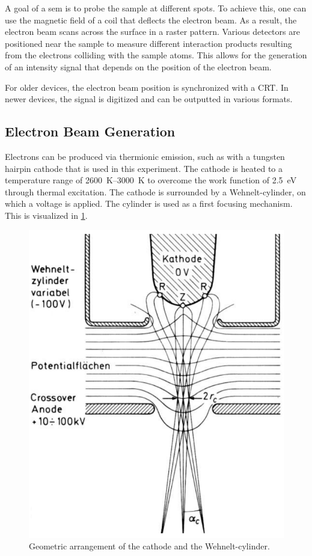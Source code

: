 A goal of a \ac{sem} is to probe the sample at different spots.
To achieve this, one can use the magnetic field of a coil that deflects
the electron beam.
As a result, the electron beam scans across the surface in a raster
pattern. Various detectors are positioned near the sample to measure
different interaction products resulting from the electrons colliding
with the sample atoms. This allows for the generation of an intensity
signal that depends on the position of the electron beam.

For older devices, the electron beam position is synchronized
with a CRT.
In newer devices, the signal is digitized and can be outputted in
various formats.

\subsection{Electron Beam Generation}
Electrons can be produced via thermionic emission, such as with a tungsten hairpin cathode that is used in this experiment.
The cathode is heated to a temperature range of
\qtyrange{2600}{3000}{\kelvin} to overcome the work function of
\qty{2.5}{\electronvolt} through thermal excitation.
The cathode is surrounded by a Wehnelt-cylinder, on which a voltage is
applied.
The cylinder is used as a first focusing mechanism.
This is visualized in \cref{fig:wolfram}.
\begin{figure}
	\centering
	\includegraphics[width=0.95\linewidth]{../assets/wolfram.png}
	\caption{Geometric arrangement of the cathode and the Wehnelt-cylinder.
		}
	\label{fig:wolfram}
\end{figure}
